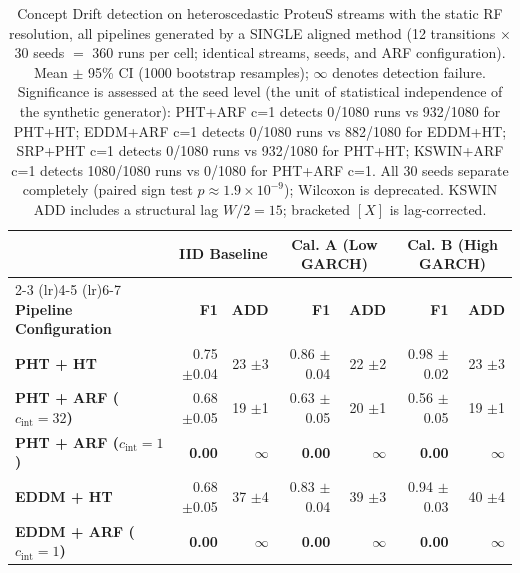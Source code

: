\begin{table}[t]
  \centering
  \caption{Concept Drift detection on heteroscedastic ProteuS streams with the static RF resolution, all pipelines generated by a SINGLE aligned method (12 transitions $\times$ 30 seeds $=$ 360 runs per cell; identical streams, seeds, and ARF configuration). Mean $\pm$ 95\% CI (1000 bootstrap resamples); $\infty$ denotes detection failure. Significance is assessed at the seed level (the unit of statistical independence of the synthetic generator): PHT+ARF c=1 detects 0/1080 runs vs 932/1080 for PHT+HT; EDDM+ARF c=1 detects 0/1080 runs vs 882/1080 for EDDM+HT; SRP+PHT c=1 detects 0/1080 runs vs 932/1080 for PHT+HT; KSWIN+ARF c=1 detects 1080/1080 runs vs 0/1080 for PHT+ARF c=1. All 30 seeds separate completely (paired sign test $p \approx 1.9\times10^{-9}$); Wilcoxon is deprecated. KSWIN ADD includes a structural lag $W/2 = 15$; bracketed $[X]$ is lag-corrected.}
  \label{tab:results_concept}
  \begin{tabular}{@{}lrrrrrr@{}}
    \toprule
                                                   & \multicolumn{2}{c}{\textbf{IID Baseline}} & \multicolumn{2}{c}{\textbf{Cal. A (Low GARCH)}} & \multicolumn{2}{c}{\textbf{Cal. B (High GARCH)}} \\
    \cmidrule(lr){2-3} \cmidrule(lr){4-5} \cmidrule(lr){6-7}
    \textbf{Pipeline Configuration}                & \textbf{F1} & \textbf{ADD} & \textbf{F1} & \textbf{ADD} & \textbf{F1} & \textbf{ADD} \\
    \midrule
    \textbf{PHT + HT}                              & 0.75 {\small $\pm$0.04} & 23 {\small $\pm$3} & 0.86 {\small $\pm$0.04} & 22 {\small $\pm$2} & 0.98 {\small $\pm$0.02} & 23 {\small $\pm$3} \\
    \textbf{PHT + ARF ($c_{\mathrm{int}} = 32$)}   & 0.68 {\small $\pm$0.05} & 19 {\small $\pm$1} & 0.63 {\small $\pm$0.05} & 20 {\small $\pm$1} & 0.56 {\small $\pm$0.05} & 19 {\small $\pm$1} \\
    \textbf{PHT + ARF ($c_{\mathrm{int}} = 1$)}    & \textbf{0.00} & $\infty$ & \textbf{0.00} & $\infty$ & \textbf{0.00} & $\infty$ \\
    \midrule
    \textbf{EDDM + HT}                             & 0.68 {\small $\pm$0.05} & 37 {\small $\pm$4} & 0.83 {\small $\pm$0.04} & 39 {\small $\pm$3} & 0.94 {\small $\pm$0.03} & 40 {\small $\pm$4} \\
    \textbf{EDDM + ARF ($c_{\mathrm{int}} = 1$)}   & \textbf{0.00} & $\infty$ & \textbf{0.00} & $\infty$ & \textbf{0.00} & $\infty$ \\

\end{tabular}
\end{table}

